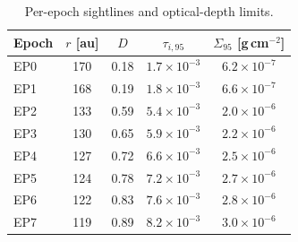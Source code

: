 \begin{table}
\caption{Per-epoch sightlines and optical-depth limits.}
\label{tab:sightlines}
\centering
\begin{tabular}{lcccc}
\hline\hline
Epoch & $r$ [au] & $\hat{D}$ & $\tau_{i,95}$ & $\Sigma_{95}$ [g\,cm$^{-2}$] \\
\hline
EP0 & 170 & 0.18 & $1.7\times 10^{-3}$ & $6.2\times 10^{-7}$ \\
EP1 & 168 & 0.19 & $1.8\times 10^{-3}$ & $6.6\times 10^{-7}$ \\
EP2 & 133 & 0.59 & $5.4\times 10^{-3}$ & $2.0\times 10^{-6}$ \\
EP3 & 130 & 0.65 & $5.9\times 10^{-3}$ & $2.2\times 10^{-6}$ \\
EP4 & 127 & 0.72 & $6.6\times 10^{-3}$ & $2.5\times 10^{-6}$ \\
EP5 & 124 & 0.78 & $7.2\times 10^{-3}$ & $2.7\times 10^{-6}$ \\
EP6 & 122 & 0.83 & $7.6\times 10^{-3}$ & $2.8\times 10^{-6}$ \\
EP7 & 119 & 0.89 & $8.2\times 10^{-3}$ & $3.0\times 10^{-6}$ \\
\hline
\end{tabular}
\end{table}
